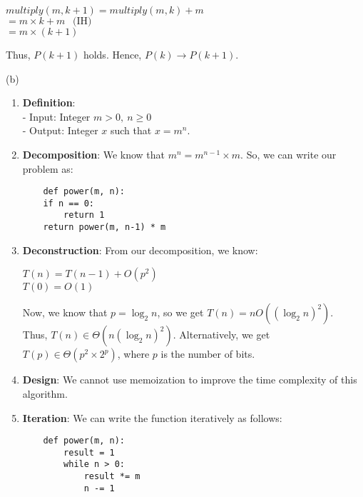 \documentclass[a4paper]{article}
\begin{document}
\begin{enumerate}
\begin{enumerate}[label=\roman*]
\begin{center}
$multiply(m, k+1) = multiply(m, k) + m$\\
$= m \times k + m\ \ \text{ (IH)}$ \\
$= m \times (k+1)$
\end{center}
Thus, $P(k+1)$ holds. Hence, $P(k) \rightarrow P(k+1)$.
    \end{enumerate}

(b)
\begin{enumerate}[label=\roman*]
    \item \textbf{Definition}:\\
    - Input: Integer $m > 0,\ n \geq 0$\\
    - Output: Integer $x$ such that $x = m^n$.
    \item \textbf{Decomposition}: We know that $m^n = m^{n-1} \times m$. So, we can write our problem as:\\
    \begin{verbatim}
    def power(m, n):
    if n == 0:
        return 1
    return power(m, n-1) * m
\end{verbatim}

\item \textbf{Deconstruction}: From our decomposition, we know:
\begin{center}
    $T(n) = T(n-1) + O(p^2)$\\
$T(0) = O(1)$
\end{center}


Now, we know that $p = \log_2 n$, so we get $T(n) = nO((\log_2 n)^2)$.\\
Thus, $T(n) \in \Theta (n (\log_2 n)^2)$. Alternatively, we get $T(p) \in \Theta(p^2 \times 2^p)$, where $p$ is the number of bits.

\item \textbf{Design}: We cannot use memoization to improve the time complexity of this algorithm.
\item \textbf{Iteration}: We can write the function iteratively as follows:
\begin{verbatim}
    def power(m, n):
        result = 1
        while n > 0:
            result *= m
            n -= 1


\end{verbatim}
\end{enumerate}
\end{enumerate}
\end{document}
